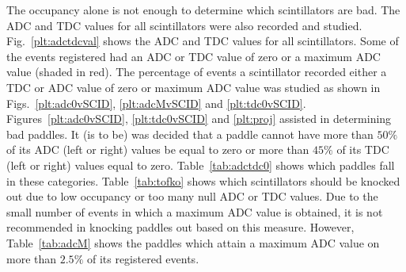The occupancy alone is not enough to determine which scintillators are bad. The ADC and TDC values for all scintillators were also recorded and studied. Fig.~\ref{plt:adctdcval} shows the ADC and TDC values for all scintillators. Some of the events registered had an ADC or TDC value of zero or a maximum ADC value (shaded in red). The percentage of events a scintillator recorded either a TDC or ADC value of zero or maximum ADC value was studied as shown in Figs.~\ref{plt:adc0vSCID}, \ref{plt:adcMvSCID} and \ref{plt:tdc0vSCID}. Figures~\ref{plt:adc0vSCID}, \ref{plt:tdc0vSCID} and \ref{plt:proj} assisted in determining bad paddles. It (is to be) was decided that a paddle cannot have more than $50\%$ of its ADC (left or right) values be equal to zero or more than $45\%$ of its TDC (left or right) values equal to zero. Table~\ref{tab:adctdc0} shows which paddles fall in these categories. Table~\ref{tab:tofko} shows which scintillators should be knocked out due to low occupancy or too many null ADC or TDC values. Due to the small number of events in which a maximum ADC value is obtained, it is not recommended in knocking paddles out based on this measure. However, Table~\ref{tab:adcM} shows the paddles which attain a maximum ADC value on more than $2.5\%$ of its registered events.





